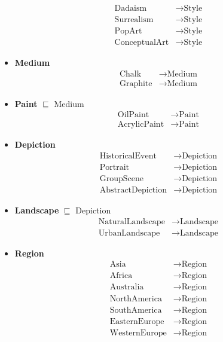 \documentclass{article}
\begin{document}
\begin{itemize}
\begin{align*}
      \text{Dadaism} &\to \text{Style}\\
      \text{Surrealism} &\to \text{Style}\\
      \text{PopArt} &\to \text{Style}\\
      \text{ConceptualArt} &\to \text{Style}
    \end{align*}
  \item \textbf{Medium}
    \begin{align*}
      \text{Chalk} &\to \text{Medium}\\
      \text{Graphite} &\to \text{Medium}
    \end{align*}
  \item \textbf{Paint} $\sqsubseteq$ Medium
    \begin{align*}
      \text{OilPaint} &\to \text{Paint}\\
      \text{AcrylicPaint} &\to \text{Paint}
    \end{align*}
  \item \textbf{Depiction}
    \begin{align*}
      \text{HistoricalEvent} &\to \text{Depiction}\\
      \text{Portrait} &\to \text{Depiction}\\
      \text{GroupScene} &\to \text{Depiction}\\
      \text{AbstractDepiction} &\to \text{Depiction}
    \end{align*}
  \item \textbf{Landscape} $\sqsubseteq$ Depiction
    \begin{align*}
      \text{NaturalLandscape} &\to \text{Landscape}\\
      \text{UrbanLandscape} &\to \text{Landscape}
    \end{align*}
  \item \textbf{Region}
    \begin{align*}
      \text{Asia} &\to \text{Region}\\
      \text{Africa} &\to \text{Region}\\
      \text{Australia} &\to \text{Region}\\
      \text{NorthAmerica} &\to \text{Region}\\
      \text{SouthAmerica} &\to \text{Region}\\
      \text{EasternEurope} &\to \text{Region}\\
      \text{WesternEurope} &\to \text{Region}
    \end{align*}
\end{itemize}
\end{document}
